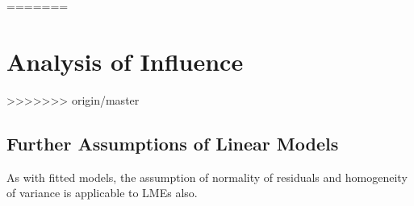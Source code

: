 \documentclass[12pt, a4paper]{report}
\theoremstyle{plain}
\theoremstyle{definition}
\theoremstyle{remark}
\begin{document}
=======
\section{Analysis of  Influence}


>>>>>>> origin/master



%
%
%
%










\subsection{Further Assumptions of Linear Models}

As with fitted models, the assumption of normality of residuals and homogeneity of variance is applicable to LMEs also. 
\end{document}
